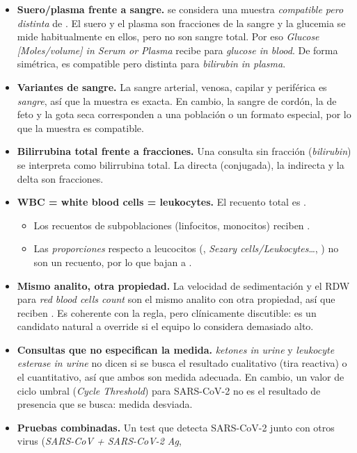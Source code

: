 \documentclass[11pt,a4paper]{article}
\begin{document}
\begin{itemize}
\item \textbf{Suero/plasma frente a sangre.}  se considera una muestra \emph{compatible pero distinta} de
  . El suero y el plasma son fracciones de la sangre y la glucemia se mide habitualmente en ellos, pero no son
  sangre total. Por eso \emph{Glucose [Moles/volume] in Serum or Plasma} recibe  para \emph{glucose in blood}.
  De forma simétrica,  es compatible pero distinta para \emph{bilirubin in plasma}.
\item \textbf{Variantes de sangre.} La sangre arterial, venosa, capilar y periférica es \emph{sangre}, así que la muestra es exacta. En cambio, la sangre de cordón,
  la de feto y la gota seca corresponden a una población o un formato especial, por lo que la muestra es compatible.
\item \textbf{Bilirrubina total frente a fracciones.} Una consulta sin fracción (\emph{bilirubin}) se interpreta como bilirrubina total.
  La directa (conjugada), la indirecta y la delta son fracciones.
\item \textbf{WBC = white blood cells = leukocytes.} El recuento total es .
  \begin{itemize}
  \item Los recuentos de subpoblaciones (linfocitos, monocitos) reciben .
  \item Las \emph{proporciones} respecto a leucocitos (, \emph{Sezary cells/Leukocytes}\ldots, ) no son un
    recuento, por lo que bajan a .
  \end{itemize}
\item \textbf{Mismo analito, otra propiedad.} La velocidad de sedimentación y el RDW para \emph{red blood cells count} son el mismo
  analito con otra propiedad, así que reciben . Es coherente con la regla, pero clínicamente discutible: es un candidato natural
  a override si el equipo lo considera demasiado alto.
\item \textbf{Consultas que no especifican la medida.} \emph{ketones in urine} y \emph{leukocyte esterase in urine} no dicen si se
  busca el resultado cualitativo (tira reactiva) o el cuantitativo, así que ambos son medida adecuada. En cambio, un valor de ciclo umbral
  (\emph{Cycle Threshold}) para SARS-CoV-2 no es el resultado de presencia que se busca: medida desviada.
\item \textbf{Pruebas combinadas.} Un test que detecta SARS-CoV-2 junto con otros virus (\emph{SARS-CoV + SARS-CoV-2 Ag},

\end{itemize}
\end{document}
